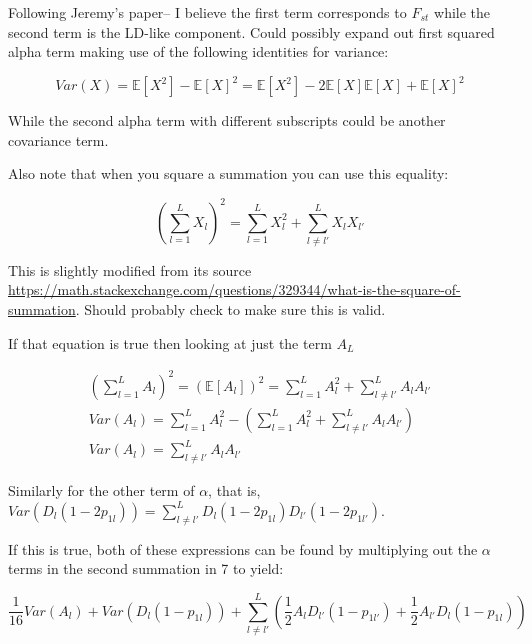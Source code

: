 \documentclass[a4paper,10pt]{article}
\begin{document}
Following Jeremy's paper-- I believe the first term corresponds to $F_{st}$ while the second term is the LD-like component. Could possibly expand out first squared alpha term making use of the following identities for variance: 

\begin{equation}
   \label{3}
   Var(X) = \mathbb{E}[X^2] - \mathbb{E}[X]^2
   = \mathbb{E}[X^2] - 2\mathbb{E}[X]\mathbb{E}[X] + \mathbb{E}[X]^2
\end{equation}

While the second alpha term with different subscripts could be another covariance term. 

Also note that when you square a summation you can use this equality: 

\begin{equation}
    \label{4}
    (\sum^L_{l=1} X_l )^2 = \sum^L_{l=1} X_l^2 + \sum^L_{l \neq l'} X_l X_{l'}
\end{equation}

This is slightly modified from its source \url{https://math.stackexchange.com/questions/329344/what-is-the-square-of-summation}. Should probably check to make sure this is valid.

If that equation is true then looking at just the term $A_L$

\begin{align}
    (\sum^L_{l=1} A_l )^2 = (\mathbb{E}[A_l])^2 = \sum^L_{l=1} A_l^2 + \sum^L_{l \neq l'} A_l A_{l'} \\
    Var(A_l) = \sum^L_{l=1} A_l^2 - (\sum^L_{l=1} A_l^2 + \sum^L_{l \neq l'} A_l A_{l'}) \\
    Var(A_l)= \sum^L_{l \neq l'} A_l A_{l'}
\end{align}

Similarly for the other term of $\alpha$, that is, $Var(D_l(1-2p_{1l})) = \sum^L_{l \neq l'} D_l(1-2p_{1l}) D_{l'}(1-2p_{1l'})$.

If this is true, both of these expressions can be found by multiplying out the $\alpha$ terms in the second summation in 7 to yield: 

\begin{equation}
    \frac{1}{16} Var(A_l) + Var(D_{l}(1-p_{1l})) + \sum_{l \neq l'}^L ( \frac{1}{2}A_l D_{l'}(1-p_{1l'}) + \frac{1}{2}A_{l'} D_{l}(1-p_{1l}) )
\end{equation}



\end{document}
